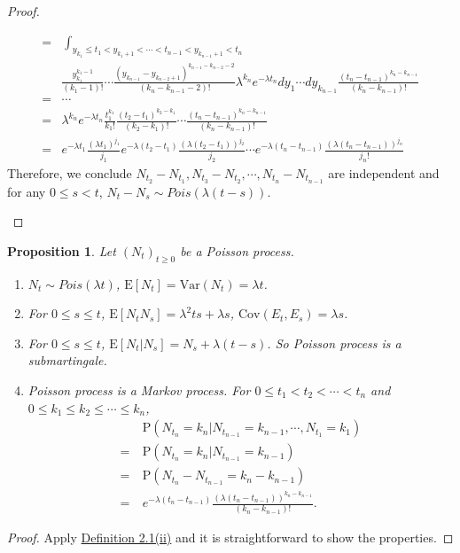 \documentclass{report}
\newtheorem{proposition}{Proposition}[section]
\theoremstyle{nonumberplain}
\newtheorem{proof}{Proof.}
\begin{document}
\begin{proof}
\begin{itemize}
\begin{align*}
	=&\ \int_{y_{k_1}\le t_1<y_{k_1+1}<\cdots<t_{n-1}<y_{k_{n-1}+1}<t_n}\\
	&\frac{y_{k_1}^{k_1-1}}{(k_1-1)!}\cdots\frac{(y_{k_{n-1}}-y_{k_{n-2}+1})^{k_{n-1}-k_{n-2}-2}}{(k_n-k_{n-1}-2)!}\lambda^{k_n}e^{-\lambda t_n}dy_1\cdots dy_{k_{n-1}}\frac{(t_{n}-t_{n-1})^{k_n-k_{n-1}}}{(k_n-k_{n-1})!}\\
	=&\cdots\\
	=&\lambda^{k_n}e^{-\lambda t_n}\frac{t_{1}^{k_1}}{k_1!}\frac{(t_{2}-t_{1})^{k_2-k_{1}}}{(k_2-k_{1})!}\cdots\frac{(t_{n}-t_{n-1})^{k_n-k_{n-1}}}{(k_n-k_{n-1})!}\\
	=&e^{-\lambda t_1}\frac{(\lambda t_1)^{j_1}}{j_1}e^{-\lambda(t_2- t_1)}\frac{(\lambda (t_2-t_1))^{j_2}}{j_2}\cdots e^{-\lambda(t_n-t_{n-1}) }\frac{(\lambda(t_{n}-t_{n-1}))^{j_n}}{j_n!}
\end{align*}
	Therefore, we conclude $N_{t_2}-N_{t_1},N_{t_3}-N_{t_2},\cdots,N_{t_n}-N_{t_{n-1}}$ are independent and for any $0\le s < t$, $N_t-N_s\sim Pois(\lambda(t-s))$.
\end{itemize}
\end{proof}

\begin{proposition}
	Let $(N_t)_{t\ge0}$ be a Poisson process.
	\begin{enumerate}
		\item $N_t\sim Pois(\lambda t)$, $\mathrm{E}[N_t]=\mathrm{Var}(N_t)=\lambda t$.
		\item For $0\le s\le t$, $\mathrm{E}[N_tN_s]=\lambda^2ts+\lambda s$, $\mathrm{Cov}(E_t,E_s)=\lambda s$.
		\item For $0\le s\le t$, $\mathrm{E}[N_t|N_s]=N_s+\lambda(t-s)$. So Poisson process is a submartingale.
		\item Poisson process is a Markov process. For $0\le t_1< t_2<\cdots<t_n$ and $0\le k_1\le k_2\le\cdots\le k_n$,
		\begin{align*} &\mathrm{P}(N_{t_n}=k_n|N_{t_{n-1}}=k_{n-1},\cdots,N_{t_1}=k_1)\\
		=\ &\mathrm{P}(N_{t_n}=k_n|N_{t_{n-1}}=k_{n-1})\\
		=\ &\mathrm{P}(N_{t_n}-N_{t_{n-1}}=k_n-k_{n-1})\\
		=\ &e^{-\lambda(t_n-t_{n-1}) }\frac{(\lambda(t_{n}-t_{n-1}))^{k_n-k_{n-1}}}{(k_n-k_{n-1})!}. 
		\end{align*}
	\end{enumerate}
\end{proposition}
\begin{proof}
	Apply \hyperlink{Definition 2.1(ii)}{Definition 2.1(ii)} and it is straightforward to show the properties.
\end{proof}
\end{document}
